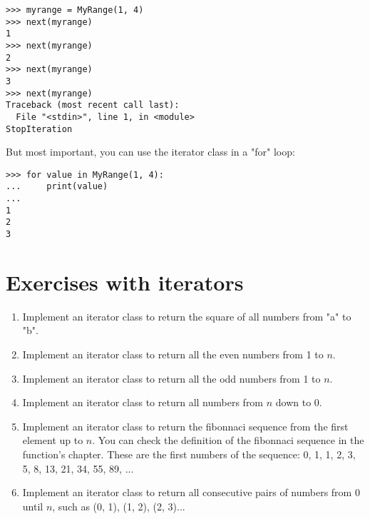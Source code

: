 \begin{lstlisting}
>>> myrange = MyRange(1, 4)
>>> next(myrange)
1
>>> next(myrange)
2
>>> next(myrange)
3
>>> next(myrange)
Traceback (most recent call last):
  File "<stdin>", line 1, in <module>
StopIteration
\end{lstlisting}

But most important, you can use the iterator class in a "for" loop:

\begin{lstlisting}
>>> for value in MyRange(1, 4):
...     print(value)
... 
1
2
3
\end{lstlisting}


\section{Exercises with iterators}

\begin{enumerate}

\item Implement an iterator class to return the square of all numbers from "a" to "b".

\item Implement an iterator class to return all the even numbers from 1 to $n$.

\item Implement an iterator class to return all the odd numbers from 1 to $n$.

\item Implement an iterator class to return all numbers from $n$ down to 0.

\item Implement an iterator class to return the fibonnaci sequence from the first element up to $n$. You can check the definition of the fibonnaci sequence in the function's chapter. These are the first numbers of the sequence: 0, 1, 1, 2, 3, 5, 8, 13, 21, 34, 55, 89, ...

\item Implement an iterator class to return all consecutive pairs of numbers from 0 until $n$, such as (0, 1), (1, 2), (2, 3)...

\end{enumerate}